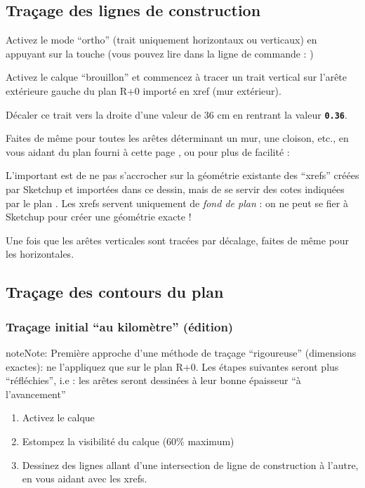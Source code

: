 \documentclass[a4paper,12pt,french]{sphinxmanual}
\begin{document}
\subsection{Traçage des lignes de construction}
\label{init_su+acad/004_acad1:tracage-des-lignes-de-construction}
Activez le mode ``ortho'' (trait uniquement horizontaux ou verticaux) en appuyant sur la touche  (vous pouvez lire dans la ligne de commande : )

Activez le calque ``brouillon'' et commencez à tracer un trait vertical sur l'arête extérieure gauche du plan R+0 importé en xref (mur extérieur).

Décaler ce trait vers la droite d'une valeur de 36 cm en rentrant la valeur \textbf{\texttt{0.36}}.

Faites de même pour toutes les arêtes déterminant un mur, une cloison, etc., en vous aidant du plan fourni à cette page {\hyperref[init_su+acad/003_su1:porkeno\string-plans\string-simples]{}}, ou pour plus de facilité :  

L'important est de ne pas s'accrocher sur la géométrie existante des ``xrefs'' créées par Sketchup et importées dans ce dessin, mais de se servir des cotes indiquées par le plan . Les xrefs servent uniquement de \emph{fond de plan} : on ne peut se fier à Sketchup pour créer une géométrie exacte !

Une fois que les arêtes verticales sont tracées par décalage, faites de même pour les horizontales.


\subsection{Traçage des contours du plan}
\label{init_su+acad/004_acad1:tracage-des-contours-du-plan}

\subsubsection{Traçage initial ``au kilomètre'' (édition)}
\label{init_su+acad/004_acad1:tracage-initial-au-kilometre-edition}
\begin{notice}{note}{Note:}
Première approche d'une méthode de traçage ``rigoureuse'' (dimensions exactes): ne l'appliquez que sur le plan R+0. Les étapes suivantes seront plus ``réfléchies'', i.e : les arêtes seront dessinées à leur bonne épaisseur ``à l'avancement''
\end{notice}
\begin{enumerate}
\item {} 
Activez le calque 

\item {} 
Estompez la visibilité du calque  (60\% maximum)

\item {} 
Dessinez des lignes allant d'une intersection de ligne de construction à l'autre, en vous aidant avec les xrefs.

\end{enumerate}
\end{document}
